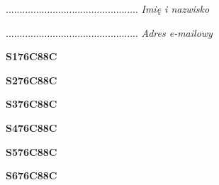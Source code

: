 \begin{turn}{90}\begin{minipage}{\linewidth} \vspace{20mm} ................................................  \textit{Imię i nazwisko}\end{minipage}\end{turn}

\begin{turn}{90}\begin{minipage}{\linewidth} \vspace{20mm} ................................................  \textit{Adres e-mailowy}\end{minipage}\end{turn}

\begin{turn}{90}\huge \begin{minipage}{\linewidth} \vspace{10mm}\textbf{S176C88C}\end{minipage}\end{turn}

\begin{turn}{90}\huge \begin{minipage}{\linewidth} \vspace{10mm}\textbf{S276C88C}\end{minipage}\end{turn}

\begin{turn}{90}\huge \begin{minipage}{\linewidth} \vspace{10mm}\textbf{S376C88C}\end{minipage}\end{turn}

\begin{turn}{90}\huge \begin{minipage}{\linewidth} \vspace{10mm}\textbf{S476C88C}\end{minipage}\end{turn}

\begin{turn}{90}\huge \begin{minipage}{\linewidth} \vspace{10mm}\textbf{S576C88C}\end{minipage}\end{turn}

\begin{turn}{90}\huge \begin{minipage}{\linewidth} \vspace{10mm}\textbf{S676C88C}\end{minipage}\end{turn}

